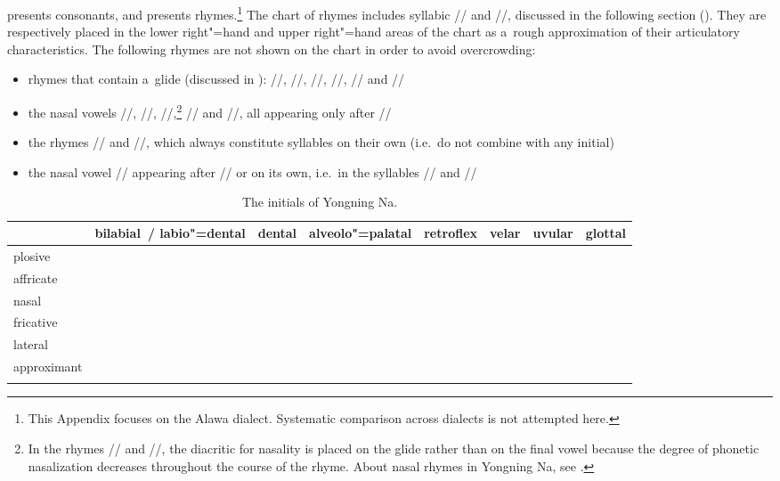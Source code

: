  presents consonants, and
 presents rhymes.\footnote{This Appendix focuses on the Alawa dialect. Systematic comparison across dialects is not attempted here.} The chart of rhymes includes syllabic // and //, discussed in the following section (). They are respectively placed in the lower
right"=hand and upper right"=hand areas of the chart as a~rough approximation of their articulatory
characteristics. The following rhymes are not shown on the chart in order to avoid overcrowding:

\begin{itemize}
	\item  rhymes that contain a~glide (discussed in ): //, //, //, //, // and //
	\item the nasal vowels
	//, //, //,\footnote{In the rhymes // and //, the diacritic for nasality is placed on
		the glide rather than on the final vowel because the degree of phonetic nasalization decreases throughout
		the course of the rhyme. About nasal rhymes in Yongning Na, see .} // and //, all appearing only after //
	\item the rhymes // and //, which always constitute syllables on their own (i.e.\ do not combine with any initial)
	\item the nasal vowel // appearing after // or on
	its own, i.e.\ in the syllables // and //
\end{itemize}

{\setlength\tabcolsep{4pt}
	\begin{table}[h!!]
		\caption{The initials of Yongning Na.}
		\begin{tabularx}{\textwidth}{ l P{14mm} l P{14mm} l l l l}
			\lsptoprule
			& bilabial~/ labio"=dental & dental & alveolo"=palatal & retroflex & velar & uvular & glottal\\\midrule
			plosive &   &  & &  &  &  & \\
			affricate &   &  &  &   & & &\\
			nasal &   &  &   &   &  & &\\
			fricative &   &  &  &  & &  & \\
			lateral  &  &  & & & & &\\
			approximant &  &  &  &  &  &  &\\\lspbottomrule
		\end{tabularx}
		\label{tab:theinitialsofyongningna}
	\end{table}}
	
